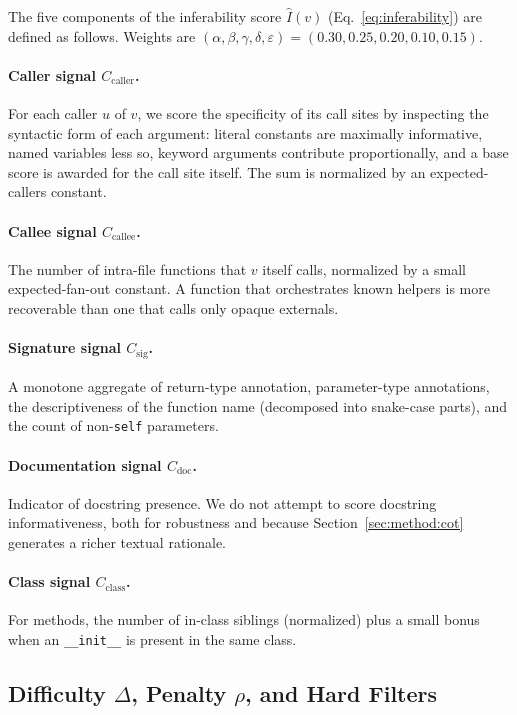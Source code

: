 The five components of the inferability score
$\hat{I}(v)$ (Eq.~\ref{eq:inferability}) are defined as follows. Weights
are $(\alpha,\beta,\gamma,\delta,\varepsilon) = (0.30, 0.25, 0.20, 0.10, 0.15)$.

\paragraph{Caller signal $C_{\mathrm{caller}}$.}
For each caller $u$ of $v$, we score the specificity of its call sites by
inspecting the syntactic form of each argument: literal constants are
maximally informative, named variables less so, keyword arguments
contribute proportionally, and a base score is awarded for the call site
itself. The sum is normalized by an expected-callers constant.

\paragraph{Callee signal $C_{\mathrm{callee}}$.}
The number of intra-file functions that $v$ itself calls, normalized by a
small expected-fan-out constant. A function that orchestrates known
helpers is more recoverable than one that calls only opaque externals.

\paragraph{Signature signal $C_{\mathrm{sig}}$.}
A monotone aggregate of return-type annotation, parameter-type annotations,
the descriptiveness of the function name (decomposed into snake-case
parts), and the count of non-\texttt{self} parameters.

\paragraph{Documentation signal $C_{\mathrm{doc}}$.}
Indicator of docstring presence. We do not attempt to score docstring
informativeness, both for robustness and because
Section~\ref{sec:method:cot} generates a richer textual rationale.

\paragraph{Class signal $C_{\mathrm{class}}$.}
For methods, the number of in-class siblings (normalized) plus a small
bonus when an \texttt{\_\_init\_\_} is present in the same class.

\subsection{Difficulty $\Delta$, Penalty $\rho$, and Hard Filters}
\label{app:algo:penalty}

